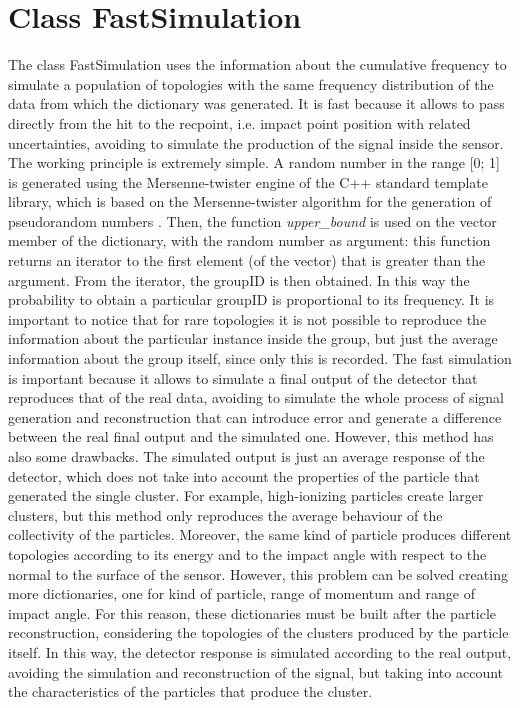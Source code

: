 \section{Class FastSimulation}
\label{sec:fast}
The class FastSimulation uses the information about the cumulative frequency to simulate a population of topologies with the same frequency distribution of the data from which the dictionary was generated. It is fast because it allows to pass directly from the hit to the recpoint, i.e. impact point position with related uncertainties, avoiding to simulate the production of the signal inside the sensor. The working principle is extremely simple. A random number in the range [0; 1] is generated using the Mersenne-twister engine of the C++ standard template library, which is based on the Mersenne-twister algorithm for the generation of pseudorandom numbers \cite{mersenne}. Then, the function \textit{upper\_bound} is used on the vector member of the dictionary, with the random number as argument: this function returns an iterator to the first element (of the vector) that is greater than the argument. From the iterator, the groupID is then obtained. In this way the probability to obtain a particular groupID is proportional to its frequency. It is important to notice that for rare topologies it is not possible to reproduce the information about the particular instance inside the group, but just the average information about the group itself, since only this is recorded. The fast simulation is important because it allows to simulate a final output of the detector that reproduces that of the real data, avoiding to simulate the whole process of signal generation and reconstruction that can introduce error and generate a difference between the real final output and the simulated one. However, this method has also some drawbacks. The simulated output is just an average response of the detector, which does not take into account the properties of the particle that generated the single cluster. For example, high-ionizing particles create larger clusters, but this method only reproduces the average behaviour of the collectivity of the particles. Moreover, the same kind of particle produces different topologies according to its energy and to the impact angle with respect to the normal to the surface of the sensor. However, this problem can be solved creating more dictionaries, one for kind of particle, range of momentum and range of impact angle. For this reason, these dictionaries must be built after the particle reconstruction, considering the topologies of the clusters produced by the particle itself. In this way, the detector response is simulated according to the real output, avoiding the simulation and reconstruction of the signal, but taking into account the characteristics of the particles that produce the cluster.
%
